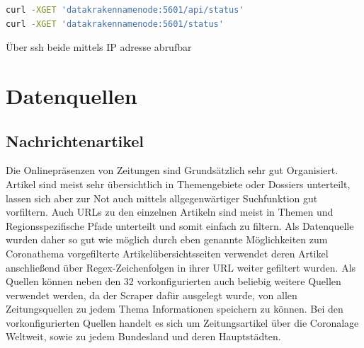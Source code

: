 \documentclass[12pt,oneside,a4paper,parskip]{scrbook}
\begin{document}
\begin{lstlisting}[caption=Statusabfrage Kibana,label=statuskibana,language=bash]
curl -XGET 'datakrakennamenode:5601/api/status'
curl -XGET 'datakrakennamenode:5601/status'
\end{lstlisting}

Über ssh beide mittels IP adresse abrufbar

\chapter{Datenquellen}
\section{Nachrichtenartikel}
Die Onlinepräsenzen von Zeitungen sind Grundsätzlich sehr gut Organisiert. Artikel sind meist sehr übersichtlich in Themengebiete oder Dossiers unterteilt, lassen sich aber zur Not auch mittels allgegenwärtiger Suchfunktion gut vorfiltern. Auch URLs zu den einzelnen Artikeln sind meist in Themen und Regionsspezifische Pfade unterteilt und somit einfach zu filtern. Als Datenquelle wurden daher so gut wie möglich durch eben genannte Möglichkeiten zum Coronathema vorgefilterte Artikelübersichtsseiten verwendet deren Artikel anschließend über Regex-Zeichenfolgen in ihrer URL weiter gefiltert wurden. Als Quellen können neben den 32 vorkonfigurierten auch beliebig weitere Quellen verwendet werden, da der Scraper dafür ausgelegt wurde, von allen Zeitungsquellen zu jedem Thema Informationen speichern zu können. Bei den vorkonfigurierten Quellen handelt es sich um Zeitungsartikel über die Coronalage Weltweit, sowie zu jedem Bundesland und deren Hauptstädten.
\end{document}

